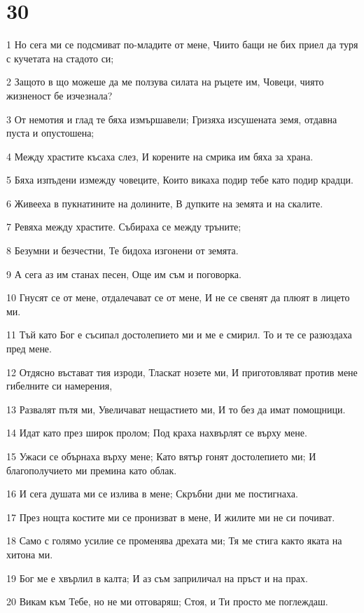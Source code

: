 \chapter{30}

\par 1 Но сега ми се подсмиват по-младите от мене, Чиито бащи не бих приел да туря с кучетата на стадото си;
\par 2 Защото в що можеше да ме ползува силата на ръцете им, Човеци, чиято жизненост бе изчезнала?
\par 3 От немотия и глад те бяха измършавели; Гризяха изсушената земя, отдавна пуста и опустошена;
\par 4 Между храстите късаха слез, И корените на смрика им бяха за храна.
\par 5 Бяха изпъдени измежду човеците, Които викаха подир тебе като подир крадци.
\par 6 Живееха в пукнатините на долините, В дупките на земята и на скалите.
\par 7 Ревяха между храстите. Събираха се между тръните;
\par 8 Безумни и безчестни, Те бидоха изгонени от земята.
\par 9 А сега аз им станах песен, Още им съм и поговорка.
\par 10 Гнусят се от мене, отдалечават се от мене, И не се свенят да плюят в лицето ми.
\par 11 Тъй като Бог е съсипал достолепието ми и ме е смирил. То и те се разюздаха пред мене.
\par 12 Отдясно въстават тия изроди, Тласкат нозете ми, И приготовляват против мене гибелните си намерения,
\par 13 Развалят пътя ми, Увеличават нещастието ми, И то без да имат помощници.
\par 14 Идат като през широк пролом; Под краха нахвърлят се върху мене.
\par 15 Ужаси се обърнаха върху мене; Като вятър гонят достолепието ми; И благополучието ми премина като облак.
\par 16 И сега душата ми се излива в мене; Скръбни дни ме постигнаха.
\par 17 През нощта костите ми се пронизват в мене, И жилите ми не си почиват.
\par 18 Само с голямо усилие се променява дрехата ми; Тя ме стига както яката на хитона ми.
\par 19 Бог ме е хвърлил в калта; И аз съм заприличал на пръст и на прах.
\par 20 Викам към Тебе, но не ми отговаряш; Стоя, и Ти просто ме поглеждаш.
